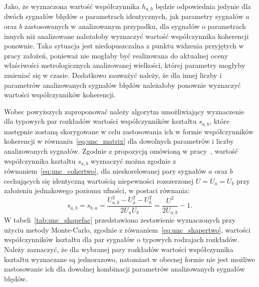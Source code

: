 Jako, że wyznaczona wartość współczynnika $h_{a,b}$ będzie odpowiednia jedynie dla dwóch sygnałów błędów o parametrach identycznych, jak parametry sygnałów $a$ oraz $b$ zastosowanych w analizowanym przypadku, dla sygnałów o parametrach innych niż analizowane należałoby wyznaczyć wartość współczynnika koherencji ponownie. Taka sytuacja jest niedopuszczalna z punktu widzenia przyjętych w pracy założeń, ponieważ nie mogłaby być realizowana do aktualnej oceny właściwości metrologicznych analizowanej wielkości, której parametry mogłyby zmieniać się w czasie. Dodatkowo zauważyć należy, że dla innej liczby i parametrów analizowanych sygnałów błędów należałoby ponownie wyznaczyć wartości współczynników koherencji.

Wobec powyższych zaproponować należy algorytm umożliwiający wyznaczenie dla typowych par rozkładów wartości współczynników kształtu $s_{a,b}$, które następnie zostaną skorygowane w celu zastosowania ich w formie współczynników koherencji w równaniu~\eqref{eq:unc_matrix} dla dowolnych parametrów i liczby analizowanych sygnałów. Zgodnie z propozycją omówioną w pracy~\cite{jakubiec_model}, wartość współczynnika kształtu $s_{a,b}$ wyznaczyć można zgodnie z równaniem~\eqref{eq:unc_cohertwo}, dla nieskorelowanej pary sygnałów $a$ oraz $b$ cechujących się identyczną wartością niepewności rozszerzonej $U = U_{a} = U_{b}$ przy założeniu jednakowego poziomu ufności, w postaci równania:
\begin{equation}
s_{a,b} = s_{b,a} = \frac{U_{a,b}^{2} - U_{a}^{2} - U_{b}^{2}}{2 U_{a} U_{b}} = \frac{U^{2}}{2 U_{a,b}} - 1 \label{eq:unc_shapertwo}.
\end{equation}
W tabeli~\ref{tab:unc_shapefac} przedstawiono zestawienie wyznaczonych przy użyciu metody Monte-Carlo, zgodnie z równaniem~\eqref{eq:unc_shapertwo}, wartości współczynników kształtu dla par sygnałów o typowych rodzajach rozkładów. Należy zaznaczyć, że dla wybranej pary rozkładów wartości współczynnika kształtu wyznaczane są jednorazowo, natomiast w obecnej formie nie jest możliwe zastosowanie ich dla dowolnej kombinacji parametrów analizowanych sygnałów błędów.

